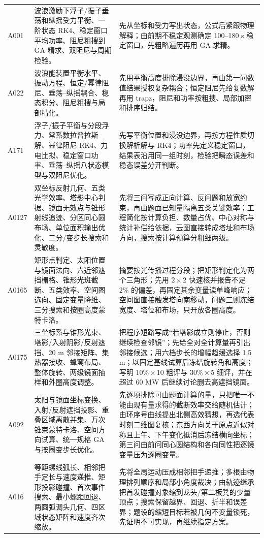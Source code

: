 \documentclass[UTF8,a4paper,12pt]{ctexart}
\begin{document}
\begin{longtable}{p{1.4cm}p{5.2cm}p{7.0cm}}
A001 & 波浪激励下浮子/振子垂荡和纵摇受力平衡、一阶状态 RK4、稳定窗口平均功率、阻尼粗搜到 GA 精求、双阻尼与周期检验。 &
先从坐标和受力写出状态，公式后紧跟物理解释；由前期不稳定观测确定 100--180 s 稳定窗口，先粗略遍历再用 GA 求精。\\
A022 & 波浪能装置平衡水平、振动方程、恒定/幂律阻尼、垂荡--纵摇耦合、稳态积分、阻尼粗搜与局部精化。 &
先用平衡高度排除浸没边界，再由第一问数值结果授权复杂耦合；恒定阻尼先给复数解再用 trapz，阻尼和功率按粗搜、局部加密和排序归结。\\
A171 & 浮子/振子平衡与分段浮力、常系数拉普拉斯解、幂律阻尼 RK4、力电比拟、稳定窗口功率、垂荡--纵摇八状态模型与双阻尼优化。 &
先写平衡位置和浸没边界，再按方程性质切换解析解与 RK4；功率先定义稳定窗口，结果表沿用同一组时刻，检验把瞬态误差和稳态误差分开判断。\\
A0127 & 双坐标反射几何、五类光学效率、塔影中心判据、镜面无效点与锥形射线追迹、分区同心圆布场、单位面积输出优化、二分/变步长搜索和灵敏度。 &
先将三问写成正向计算、反问题和放宽约束，再由题面已知量隔离五类关键效率；工程简化按计算负担、数量占优、中心对称与统计补偿给依据，云图直接转成塔址和布场方向，搜索按计算预算分粗细两级。\\
A0165 & 矩形点判定、太阳位置与镜面法向、六近邻遮挡栅格、锥形光斑截断、五类效率、空间图选向、固定变量降维、三分搜索和按圈高度蒙特卡洛。 &
摘要按光传播过程分段；把矩形判定化为两个三角形；先用 $2\times2$ 快速核并报告不足 $2\%$ 的偏差，再固定其余变量读单峰响应；空间图直接触发塔向南移动，问题三则冻结宽度、塔位和布场，只开放各圈高度。\\
A0175 & 三坐标系与锥形光束、塔影/入射阴影/反射遮挡、20 m 邻接矩阵、集热器接收、蜂窝布局、整体旋转、两级镜面抽样和外圈高度调整。 &
把程序短路写成“若塔影成立则停止，否则继续检查邻镜”；先给全对全计算量再引出邻接候选；用六档步长的增幅趋缓选择 1.5 m；以固定基线试算后冻结旋转角和高度；写明 $10\%\times10$ 粗评与 $30\%\times5$ 细评，并在超过 60 MW 后继续讨论删去高遮挡镜面。\\
A092 & 太阳与镜面坐标变换、入射/反射遮挡投影、重叠区域离散并集、万次锥束蒙特卡洛、空间方向试算、统一规格 GA 与按圈变步长优化。 &
先逐项排除可由题面计算的量，只把唯一不能由现有量求得的截断效率交给随机估计；由环序号曲线提出北侧高效猜想，再选代表时刻二维图复核；东西方向关于原点近似对称且上午、下午变化抵消后冻结横向坐标；第三问由前问同心圆结构和各向同性把逐镜变量压为逐圈变量。\\
A016 & 等距螺线弧长、相邻把手定长与速度递推、矩形投影碰撞、首次事件搜索、最小螺距回退、两圆弧调头几何、四区域状态矩阵和速度齐次缩放。 &
先将全局运动压成相邻把手递推；多根由物理排列顺序和局部小角度裁决；由轨迹继承把首发碰撞对象缩到龙头/第二板凳的少量顶点；搜索保留越界、回退、折半和误差界；题设的缩短目标若被几何不变量锁死，先证明不可实现，再继续指定方案。\\

\end{longtable}
\end{document}
